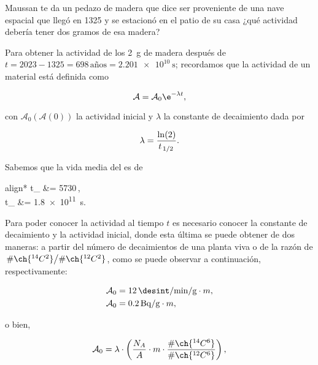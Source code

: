 \documentclass[./../main.tex]{subfiles}
\begin{document}
	\begin{exercise}
		Maussan te da un pedazo de madera que dice ser proveniente de una nave espacial que llegó en 1325 y se estacionó en el patio de su casa ¿qué actividad debería tener dos gramos de esa madera?

		\begin{solution}
			Para obtener la actividad de los \qty{2}{\g} de madera después de \(t = 2023 - 1325 = 698 \,\text{años} = \qty{2.201e10}{\s}\); recordamos que la actividad de un material está definida como

			\begin{equation}
				\mathcal{A} = \mathcal{A}_{0}\e^{-\lambda t},
				\label{eq:activity_decay}
			\end{equation}

			con \(\mathcal{A}_{0} (\mathcal{A}(0))\) la actividad inicial y \(\lambda\) la constante de decaimiento dada por

			\begin{equation}
				\lambda = \dfrac{\ln(2)}{t_{\slashfrac{1}{2}}}.
				\label{eq:decay_constant}
			\end{equation}

			Sabemos que la vida media del  es de

			\begin{empheq}[box = \secbox]{align*}
				t_{} &= 5730\,,\\
				t_{} &= \qty{1.8e11}{\s}.
			\end{empheq}

			Para poder conocer la actividad al tiempo \(t\) es necesario conocer la constante de decaimiento y la actividad inicial, donde esta última se puede obtener de dos maneras: a partir del número de decaimientos de una planta viva o de la razón de \(\slashfrac{\#\ch{^{14}C^{2}}}{\#\ch{^{12}C^{2}}}\), como se puede observar a continuación, respectivamente:

			\begin{align}
				\mathcal{A}_{0} &= \qty{12}{\desint\per\min\per\g}\cdot m,\nonumber\\
				\mathcal{A}_{0} &= \qty[per-mode=symbol]{0.2}{\becquerel\per\g}\cdot m,
				\label{eq:initial_activity_per_desint}
			\end{align}

			o bien,

			\begin{equation}
				\mathcal{A}_{0} = \lambda \cdot \left(\dfrac{N_{A}}{A}\cdot m\cdot \dfrac{\#\ch{^{14}C^{6}}}{\#\ch{^{12}C^{6}}}\right),
				\label{eq:initial_activity_per_ratio}
			\end{equation}


\end{solution}
\end{exercise}
\end{document}
